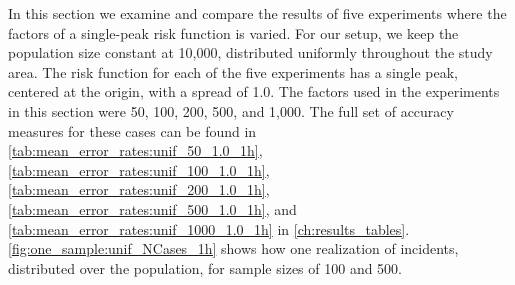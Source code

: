 In this section we examine and compare the results of five experiments where the \glspl{factor} of a single-peak risk function is varied.
For our setup, we keep the population size constant at 10,000,
distributed uniformly throughout the study area.
The risk function for each of the five experiments has a single peak,
centered at the origin,
with a \gls{spread} of 1.0.
The \glspl{factor} used in the experiments in this section were 50, 100, 200, 500, and 1,000.
The full set of accuracy measures for these cases can be found in \autoref{tab:mean_error_rates:unif_50_1.0_1h}, \autoref{tab:mean_error_rates:unif_100_1.0_1h}, \autoref{tab:mean_error_rates:unif_200_1.0_1h}, \autoref{tab:mean_error_rates:unif_500_1.0_1h}, and \autoref{tab:mean_error_rates:unif_1000_1.0_1h} in \autoref{ch:results_tables}.
\autoref{fig:one_sample:unif_NCases_1h} shows how one realization of incidents, distributed over the population, for sample sizes of 100 and 500.

